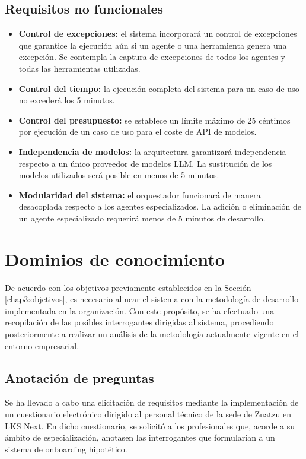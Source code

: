 \subsection{Requisitos no funcionales}
\begin{itemize}
\item\textbf{Control de excepciones: }el sistema incorporará un control de excepciones que garantice la ejecución aún si un agente o una herramienta genera una excepción. Se contempla la captura de excepciones de todos los agentes y todas las herramientas utilizadas.
\item\textbf{Control del tiempo: }la ejecución completa del sistema para un caso de uso no excederá los 5 minutos.
\item\textbf{Control del presupuesto: }se establece un límite máximo de 25 céntimos por ejecución de un caso de uso para el coste de API de modelos.
\item\textbf{Independencia de modelos: }la arquitectura garantizará independencia respecto a un único proveedor de modelos LLM. La sustitución de los modelos utilizados será posible en menos de 5 minutos.
\item\textbf{Modularidad del sistema: }el orquestador funcionará de manera desacoplada respecto a los agentes especializados. La adición o eliminación de un agente especializado requerirá menos de 5 minutos de desarrollo.
\end{itemize}

\section{Dominios de conocimiento}
De acuerdo con los objetivos previamente establecidos en la Sección \ref{chap3:objetivos}, es necesario alinear el sistema con la metodología de desarrollo implementada en la organización. Con este propósito, se ha efectuado una recopilación de las posibles interrogantes dirigidas al sistema, procediendo posteriormente a realizar un análisis de la metodología actualmente vigente en el entorno empresarial.

\subsection{Anotación de preguntas}
Se ha llevado a cabo una elicitación de requisitos mediante la implementación de un cuestionario electrónico dirigido al personal técnico de la sede de Zuatzu en LKS Next. En dicho cuestionario, se solicitó a los profesionales que, acorde a su ámbito de especialización, anotasen las interrogantes que formularían a un sistema de onboarding hipotético.

